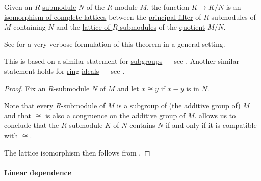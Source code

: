 \begin{theorem}\label{thm:lattice_theorem_for_submodules}
  Given an \( R \)-\hyperref[def:module/submodel]{submodule} \( N \) of the \( R \)-module \( M \), the function \( K \mapsto K / N \) is an \hyperref[def:lattice/homomorphism]{isomorphism of complete lattices} between the \hyperref[def:lattice_ideal/principal]{principal filter} of \( R \)-submodules of \( M \) containing \( N \) and the \hyperref[thm:semiring_of_ideals/lattice]{lattice of \( R \)-submodules} of the \hyperref[def:module/quotient]{quotient} \( M / N \).
\end{theorem}
\begin{comments}
  \item See  for a very verbose formulation of this theorem in a general setting.

  \item This is based on a similar statement for \hyperref[def:group/submodel]{subgroups} --- see . Another similar statement holds for \hyperref[def:ring]{ring} \hyperref[def:semiring_ideal]{ideals} --- see .
\end{comments}
\begin{proof}
  Fix an \( R \)-submodule \( N \) of \( M \) and let \( x \cong y \) if \( x - y \) is in \( N \).

  Note that every \( R \)-submodule of \( M \) is a subgroup of (the additive group of) \( M \) and that \( {\cong} \) is also a congruence on the additive group of \( M \).  allows us to conclude that the \( R \)-submodule \( K \) of \( N \) contains \( N \) if and only if it is compatible with \( {\cong} \).

  The lattice isomorphism then follows from .
\end{proof}

\paragraph{Linear dependence}


